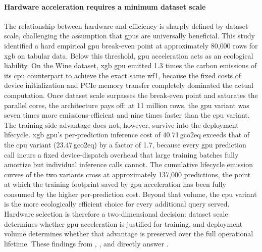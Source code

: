 \paragraph{Hardware acceleration requires a minimum dataset scale}
The relationship between hardware and efficiency is sharply defined by dataset scale, challenging the assumption that \glspl{gpu} are universally beneficial. This study identified a hard empirical \gls{gpu} break-even point at approximately 80{,}000 rows for \gls{xgb} on tabular data. Below this threshold, \gls{gpu} acceleration acts as an ecological liability. On the Wine dataset, \gls{xgb} \gls{gpu} emitted 1.3 times the carbon emissions of its \gls{cpu} counterpart to achieve the exact same \gls{wf1}, because the fixed costs of device initialization and PCIe memory transfer completely dominated the actual computation. Once dataset scale surpasses the break-even point and saturates the parallel cores, the architecture pays off: at 11 million rows, the \gls{gpu} variant was seven times more emissions-efficient and nine times faster than the \gls{cpu} variant. The training-side advantage does not, however, survive into the deployment lifecycle. \gls{xgb} \gls{gpu}'s per-prediction inference cost of 40.71\,\textmu\gls{gco2eq} exceeds that of the \gls{cpu} variant (23.47\,\textmu\gls{gco2eq}) by a factor of 1.7, because every \gls{gpu} prediction call incurs a fixed device-dispatch overhead that large training batches fully amortize but individual inference calls cannot. The cumulative lifecycle emission curves of the two variants cross at approximately 137{,}000 predictions, the point at which the training footprint saved by \gls{gpu} acceleration has been fully consumed by the higher per-prediction cost. Beyond that volume, the \gls{cpu} variant is the more ecologically efficient choice for every additional query served. Hardware selection is therefore a two-dimensional decision: dataset scale determines whether \gls{gpu} acceleration is justified for training, and deployment volume determines whether that advantage is preserved over the full operational lifetime. These findings from , , and  directly answer .

